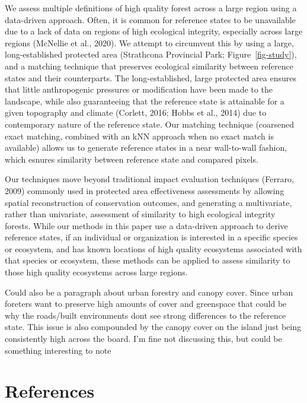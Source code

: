 \documentclass[
]{agujournal2019}
\begin{document}
We assess multiple definitions of high quality forest across a large
region using a data-driven approach. Often, it is common for reference
states to be unavailable due to a lack of data on regions of high
ecological integrity, especially across large regions (McNellie et al.,
2020). We attempt to circumvent this by using a large, long-established
protected area (Strathcona Provincial Park; Figure~\ref{fig-study}), and
a matching technique that preserves ecological similarity between
reference states and their counterparts. The long-established, large
protected area ensures that little anthropogenic pressures or
modification have been made to the landscape, while also guaranteeing
that the reference state is attainable for a given topography and
climate (Corlett, 2016; Hobbs et al., 2014) due to contemporary nature
of the reference state. Our matching technique (coarsened exact
matching, combined with an kNN approach when no exact match is
available) allows us to generate reference states in a near wall-to-wall
fashion, which esnures similarity between reference state and compared
pixels.

Our techniques move beyond traditional impact evaluation techniques
(Ferraro, 2009) commonly used in protected area effectiveness
assessments by allowing spatial reconstruction of conservation outcomes,
and generating a multivariate, rather than univariate, assessment of
similarity to high ecological integrity forests. While our methods in
this paper use a data-driven approach to derive reference states, if an
individual or organization is interested in a specific species or
ecosystem, and has known locations of high quality ecosystems associated
with that species or ecosystem, these methods can be applied to assess
similarity to those high quality ecosystems across large regions.

Could also be a paragraph about urban forestry and canopy cover. Since
urban foreters want to preserve high amounts of cover and greenspace
that could be why the roads/built environments dont see strong
differences to the reference state. This issue is also compounded by the
canopy cover on the island just being consistently high across the
board. I'm fine not discussing this, but could be something interesting
to note

\section*{References}\label{references}
\end{document}
